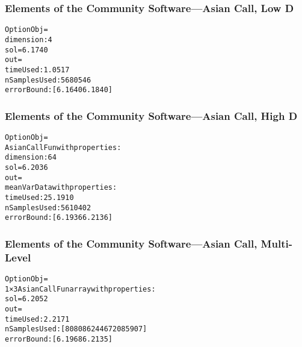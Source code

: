 \documentclass[11pt,compress,xcolor={usenames,dvipsnames},aspectratio=169]{beamer}
\begin{document}
\begin{frame}[fragile]
\frametitle{Elements of the Community Software---Asian Call, Low D}
\vspace{-5ex}


\begin{alltt}
OptionObj = 
dimension: 4
sol = 6.1740
out = 
timeUsed: 1.0517
nSamplesUsed: 5680546
errorBound: [6.1640 6.1840]
\end{alltt}
\end{frame}


\begin{frame}[fragile]
\frametitle{Elements of the Community Software---Asian Call, High D}
\vspace{-5ex}


\begin{alltt}
OptionObj = 
AsianCallFun with properties:
dimension: 64
sol =6.2036
out = 
meanVarData with properties:
timeUsed: 25.1910
nSamplesUsed: 5610402
errorBound: [6.1936 6.2136]
\end{alltt}
\end{frame}


\begin{frame}[fragile]
\frametitle{Elements of the Community Software---Asian Call, Multi-Level}
\vspace{-5ex}


\begin{alltt}
OptionObj = 
1×3 AsianCallFun array with properties:
sol = 6.2052
out = 
timeUsed: 2.2171
nSamplesUsed: [8080862 446720 85907]
errorBound: [6.1968 6.2135]
\end{alltt}
\end{frame}









\thankyouframe

\printbibliography
\end{document}
